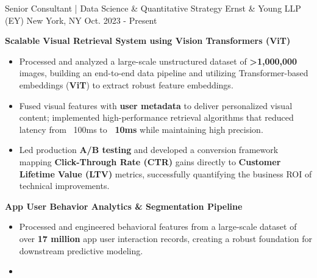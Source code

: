 

\begin{cventries}

\cventry
  {Senior Consultant | Data Science \& Quantitative Strategy}
  {Ernst \& Young LLP (EY)}
  {New York, NY}
  {Oct. 2023 - Present}
  {
    \begin{cvitems}
      \item {\textbf{Scalable Visual Retrieval System using Vision Transformers (ViT)}}
        \begin{itemize}
          \item {
            Processed and analyzed a large-scale unstructured dataset of \textbf{>1,000,000} images, 
            building an end-to-end data pipeline and utilizing Transformer-based embeddings (\textbf{ViT}) to extract robust feature embeddings.
          }
          \item {
            Fused visual features with \textbf{user metadata} to deliver personalized visual content; 
            implemented high-performance retrieval algorithms that reduced latency from ~100ms 
            to \textbf{~10ms} while maintaining high precision.
          }
          \item {
            Led production \textbf{A/B testing} and developed a conversion framework mapping 
            \textbf{Click-Through Rate (CTR)} gains directly to \textbf{Customer Lifetime Value (LTV)} metrics, 
            successfully quantifying the business ROI of technical improvements.
          }
        \end{itemize}
      \vspace{0.5mm}
      \item {\textbf{App User Behavior Analytics \& Segmentation Pipeline}}
        \begin{itemize}
          \item {
            Processed and engineered behavioral features from a large-scale dataset of 
            over \textbf{17 million} app user interaction records, 
            creating a robust foundation for downstream predictive modeling.
          }
          \item {
}
\end{itemize}
\end{cvitems}}
\end{cventries}
